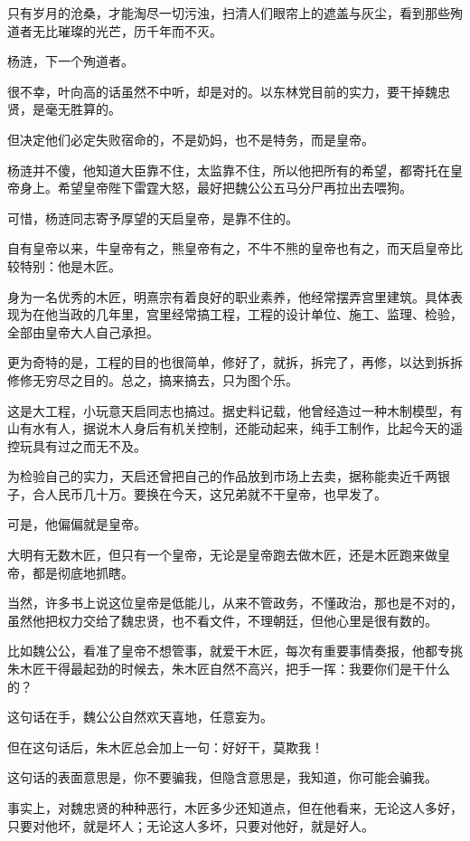 \begin{multicols}{\theparacolNo}
		只有岁月的沧桑，才能淘尽一切污浊，扫清人们眼帘上的遮盖与灰尘，看到那些殉道者无比璀璨的光芒，历千年而不灭。

		杨涟，下一个殉道者。

		很不幸，叶向高的话虽然不中听，却是对的。以东林党目前的实力，要干掉魏忠贤，是毫无胜算的。

		但决定他们必定失败宿命的，不是奶妈，也不是特务，而是皇帝。

		杨涟并不傻，他知道大臣靠不住，太监靠不住，所以他把所有的希望，都寄托在皇帝身上。希望皇帝陛下雷霆大怒，最好把魏公公五马分尸再拉出去喂狗。

		可惜，杨涟同志寄予厚望的天启皇帝，是靠不住的。

		自有皇帝以来，牛皇帝有之，熊皇帝有之，不牛不熊的皇帝也有之，而天启皇帝比较特别：他是木匠。

		身为一名优秀的木匠，明熹宗有着良好的职业素养，他经常摆弄宫里建筑。具体表现为在他当政的几年里，宫里经常搞工程，工程的设计单位、施工、监理、检验，全部由皇帝大人自己承担。

		更为奇特的是，工程的目的也很简单，修好了，就拆，拆完了，再修，以达到拆拆修修无穷尽之目的。总之，搞来搞去，只为图个乐。

		这是大工程，小玩意天启同志也搞过。据史料记载，他曾经造过一种木制模型，有山有水有人，据说木人身后有机关控制，还能动起来，纯手工制作，比起今天的遥控玩具有过之而无不及。

		为检验自己的实力，天启还曾把自己的作品放到市场上去卖，据称能卖近千两银子，合人民币几十万。要换在今天，这兄弟就不干皇帝，也早发了。

		可是，他偏偏就是皇帝。

		大明有无数木匠，但只有一个皇帝，无论是皇帝跑去做木匠，还是木匠跑来做皇帝，都是彻底地抓瞎。

		当然，许多书上说这位皇帝是低能儿，从来不管政务，不懂政治，那也是不对的，虽然他把权力交给了魏忠贤，也不看文件，不理朝廷，但他心里是很有数的。

		比如魏公公，看准了皇帝不想管事，就爱干木匠，每次有重要事情奏报，他都专挑朱木匠干得最起劲的时候去，朱木匠自然不高兴，把手一挥：我要你们是干什么的？

		这句话在手，魏公公自然欢天喜地，任意妄为。

		但在这句话后，朱木匠总会加上一句：好好干，莫欺我！

		这句话的表面意思是，你不要骗我，但隐含意思是，我知道，你可能会骗我。

		事实上，对魏忠贤的种种恶行，木匠多少还知道点，但在他看来，无论这人多好，只要对他坏，就是坏人；无论这人多坏，只要对他好，就是好人。


\end{multicols}
